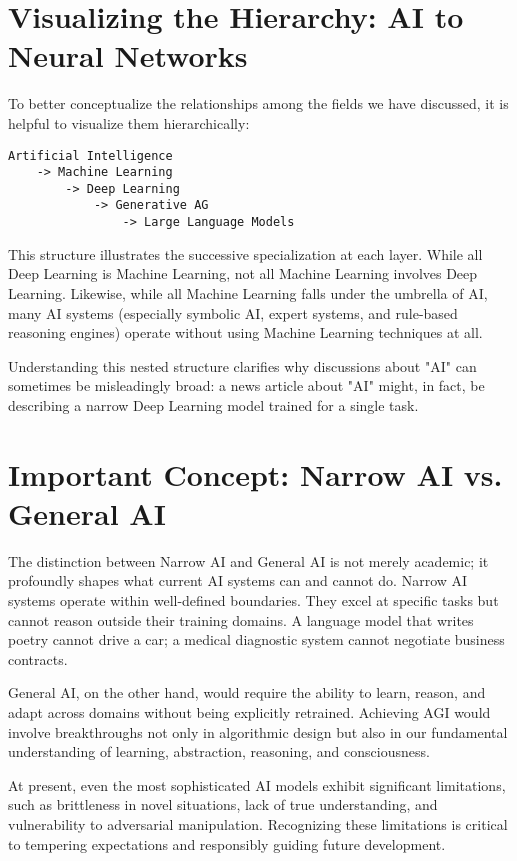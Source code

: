 \documentclass[openany]{book}
\begin{document}
\section{Visualizing the Hierarchy: AI to Neural Networks}

To better conceptualize the relationships among the fields we have discussed, 
it is helpful to visualize them hierarchically:

\begin{verbatim}
Artificial Intelligence
    -> Machine Learning
        -> Deep Learning
            -> Generative AG
                -> Large Language Models
\end{verbatim}

This structure illustrates the successive specialization at each layer. 
While all Deep Learning is Machine Learning, not all Machine Learning involves 
Deep Learning. Likewise, while all Machine Learning falls under the umbrella of 
AI, many AI systems (especially symbolic AI, expert systems, and rule-based 
reasoning engines) operate without using Machine Learning techniques at all.

Understanding this nested structure clarifies why discussions about "AI" can 
sometimes be misleadingly broad: a news article about "AI" might, in fact, be 
describing a narrow Deep Learning model trained for a single task.

\section{Important Concept: Narrow AI vs. General AI}

The distinction between Narrow AI and General AI is not merely academic; it 
profoundly shapes what current AI systems can and cannot do. Narrow AI systems 
operate within well-defined boundaries. They excel at specific tasks but cannot 
reason outside their training domains. A language model that writes poetry 
cannot drive a car; a medical diagnostic system cannot negotiate business 
contracts.

General AI, on the other hand, would require the ability to learn, reason, and 
adapt across domains without being explicitly retrained. Achieving AGI would 
involve breakthroughs not only in algorithmic design but also in our fundamental 
understanding of learning, abstraction, reasoning, and consciousness.

At present, even the most sophisticated AI models exhibit significant 
limitations, such as brittleness in novel situations, lack of true 
understanding, and vulnerability to adversarial manipulation. Recognizing these 
limitations is critical to tempering expectations and responsibly guiding 
future development.
\end{document}
